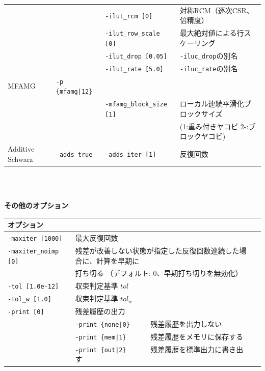 \documentclass[a4paper]{jarticle}
\begin{document}
{{\begin{minipage}[t]{\textwidth}
\begin{center}
\begin{tabular}{l|lll}
         &                       & \verb=-ilut_rcm [0]= & 対称RCM（逐次CSR、倍精度） \\
         &                       & \verb=-ilut_row_scale [0]= & 最大絶対値による行スケーリング \\
         &                       & \verb=-ilut_drop [0.05]= & \verb=-iluc_drop=の別名 \\
         &                       & \verb=-ilut_rate [5.0]= & \verb=-iluc_rate=の別名 \\
MFAMG   & \verb=-p {mfamg|12}=  &                             &                            \\
         &                       & \verb=-mfamg_block_size [1]= & ローカル連続平滑化ブロックサイズ \\
         &                       &                              & (1:重み付きヤコビ 2-:ブロックヤコビ) \\
Additive Schwarz  & \verb=-adds true=   &  \verb=-adds_iter [1]= & 反復回数   \\
\hline         
\end{tabular}
\end{center}
\end{minipage}
\\ \\
\begin{minipage}[t]{\textwidth}
\begin{center}
{\bf その他のオプション}\\
\begin{tabular}{l|ll}\hline\hline
オプション &                          \\ \hline
\verb=-maxiter [1000]= & 最大反復回数         \\
\verb=-maxiter_noimp [0]= & 残差が改善しない状態が指定した反復回数連続した場合に、計算を早期に \\
                       & 打ち切る （デフォルト: 0、早期打ち切りを無効化） \\
\verb=-tol [1.0e-12]=  & 収束判定基準 $tol$             \\
\verb=-tol_w [1.0]=    & 収束判定基準 $tol_w$           \\
\verb=-print [0]=      & 残差履歴の出力                 \\
                       & \verb=-print {none|0}     =  残差履歴を出力しない \\
                       & \verb=-print {mem|1}      =  残差履歴をメモリに保存する\\
                       & \verb=-print {out|2}      =  残差履歴を標準出力に書き出す\\

\end{tabular}
\end{center}
\end{minipage}}}
\end{document}
